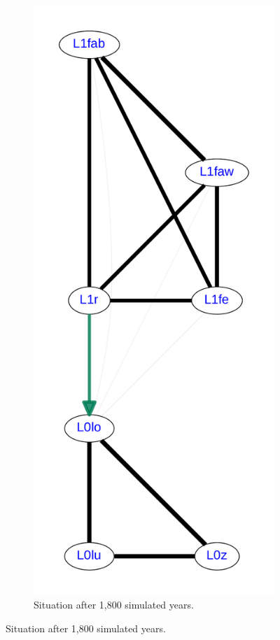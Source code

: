 \begin{figure}
\begin{subfigure}{0.25\hsize}
 \centering
 \includegraphics[scale=0.15]{figures/sim-example-initial-map.pdf}
 \caption{Situation after 1,800 simulated years.}

\end{subfigure}
\end{figure}
